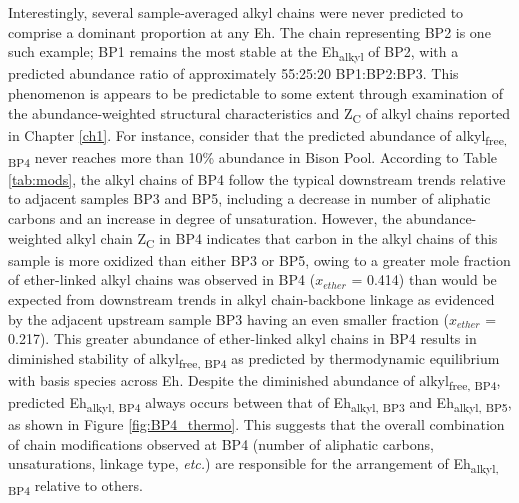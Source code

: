 Interestingly, several sample-averaged alkyl chains were never predicted to comprise a dominant proportion at any Eh. The chain representing BP2 is one such example; BP1 remains the most stable at the Eh\textsubscript{alkyl} of BP2, with a predicted abundance ratio of approximately 55:25:20 BP1:BP2:BP3. This phenomenon is appears to be predictable to some extent through examination of the abundance-weighted structural characteristics and Z\textsubscript{C} of alkyl chains reported in Chapter \ref{ch1}. For instance, consider that the predicted abundance of alkyl\textsubscript{free, BP4} never reaches more than 10\% abundance in Bison Pool. According to Table \ref{tab:mods}, the alkyl chains of BP4 follow the typical downstream trends relative to adjacent samples BP3 and BP5, including a decrease in number of aliphatic carbons and an increase in degree of unsaturation. However, the abundance-weighted alkyl chain Z\textsubscript{C} in BP4 indicates that carbon in the alkyl chains of this sample is more oxidized than either BP3 or BP5, owing to a greater mole fraction of ether-linked alkyl chains was observed in BP4 ($x_{ether}$ = 0.414) than would be expected from downstream trends in alkyl chain-backbone linkage as evidenced by the adjacent upstream sample BP3 having an even smaller fraction ($x_{ether}$ = 0.217). This greater abundance of ether-linked alkyl chains in BP4 results in diminished stability of alkyl\textsubscript{free, BP4} as predicted by thermodynamic equilibrium with basis species across Eh. Despite the diminished abundance of alkyl\textsubscript{free, BP4}, predicted Eh\textsubscript{alkyl, BP4} always occurs between that of Eh\textsubscript{alkyl, BP3} and Eh\textsubscript{alkyl, BP5}, as shown in Figure \ref{fig:BP4_thermo}. This suggests that the overall combination of chain modifications observed at BP4 (number of aliphatic carbons, unsaturations, linkage type, \textit{etc.}) are responsible for the arrangement of Eh\textsubscript{alkyl, BP4} relative to others.


